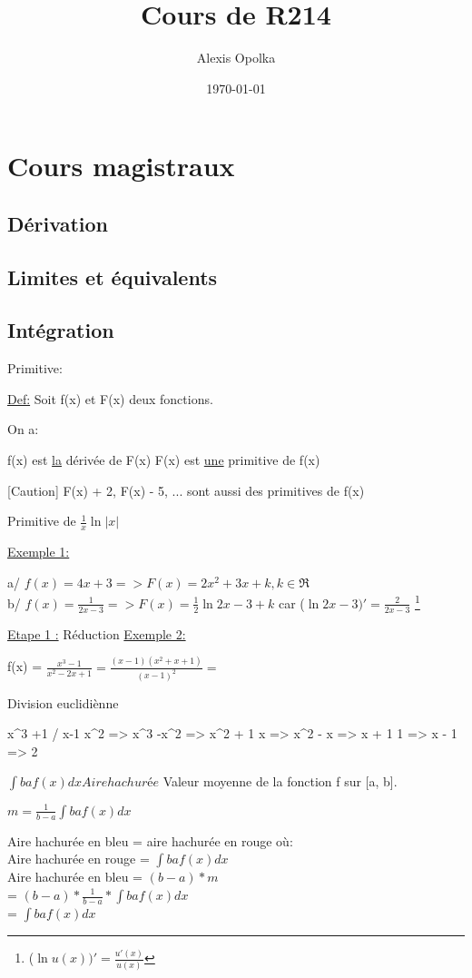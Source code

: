 \documentclass{report}
\begin{document}
  \title{Cours de R214}
  \author{Alexis Opolka}
  \date{\today}
  \maketitle

  \part{Cours magistraux}

  \chapter{Dérivation}
  \chapter{Limites et équivalents}
  \chapter{Intégration}

    Primitive:

    \underline{Def:} Soit f(x) et F(x) deux fonctions.

    On a:

    f(x) est \underline{la} dérivée de F(x)
    F(x) est \underline{une} primitive de f(x)

    [Caution] F(x) + 2, F(x) - 5, ...
    sont aussi des primitives de f(x)

    Primitive de $\frac{1}{x} \ln{|x|}$

    \underline{Exemple 1:}

    a/ $f(x) = 4x + 3 => F(x) = 2x^2 + 3x + k, k \in \Re$ \\
    b/ $f(x) = \frac{1}{2x - 3} => F(x) = \frac{1}{2} \ln{2x-3} + k$
      car ($\ln{2x-3})' =\frac{2}{2x-3}$ \footnote{($\ln{u(x)})' = \frac{u'(x)}{u(x)}$}

    \underline{Etape 1 :} Réduction
    \underline{Exemple 2:}

    f(x) = $\frac{x^3-1}{x^2-2x+1} = \frac{(x-1)(x^2 +x +1)}{(x-1)^2} = $


    Division euclidiènne

    x^3 +1 / x-1
    x^2 => x^3 -x^2 => x^2 + 1
    x => x^2 - x => x + 1
    1 => x - 1 => 2

    $\int{b}{a} f(x) dx  Aire hachurée$
    Valeur moyenne de la fonction f sur [a, b].

    $m = \frac{1}{b-a} \int{b}{a} f(x) dx$

    Aire hachurée en bleu = aire hachurée en rouge où: \\

    Aire hachurée en rouge = $\int{b}{a} f(x) dx$ \\
    Aire hachurée en bleu = $(b-a)*m$ \\
                          = $(b-a)* \frac{1}{b-a} * \int{b}{a} f(x) dx$ \\
                          = $\int{b}{a} f(x) dx$

    
\end{document}
